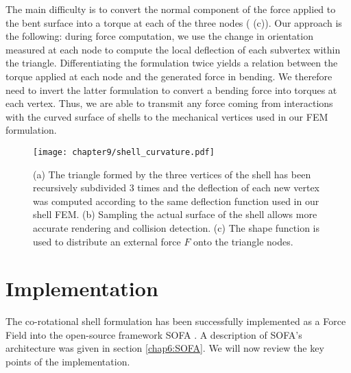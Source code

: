 The main difficulty is to convert the normal component of the force applied to the bent surface into a torque at each of the three nodes ( (c)). Our approach is the following: during force computation, we use the change in orientation measured at each node to compute the local deflection of each subvertex within the triangle. Differentiating the formulation twice yields a relation between the torque applied at each node and the generated force in bending. We therefore need to invert the latter formulation to convert a bending force into torques at each vertex. Thus, we are able to transmit any force coming from interactions with the curved surface of shells to the mechanical vertices used in our FEM formulation. 
%
\begin{figure}[ht]
\centering
\texttt{[image: chapter9/shell\_curvature.pdf]}
\caption {(a)  The triangle formed by the three vertices of the shell has been recursively subdivided 3 times and the deflection of each new vertex was computed according to the same deflection function used in our shell FEM. (b) Sampling the actual surface of the shell allows more accurate rendering and collision detection. (c) The shape function is used to distribute an external force $F$ onto the triangle nodes.}
\label{chap9:fig-shell}
\end{figure}


\section{Implementation}

The co-rotational shell formulation has been successfully implemented as a Force Field into the open-source framework SOFA \citep{Allard07}. A description of SOFA's architecture was given in section \ref{chap6:SOFA}. We will now review the key points of the implementation.


